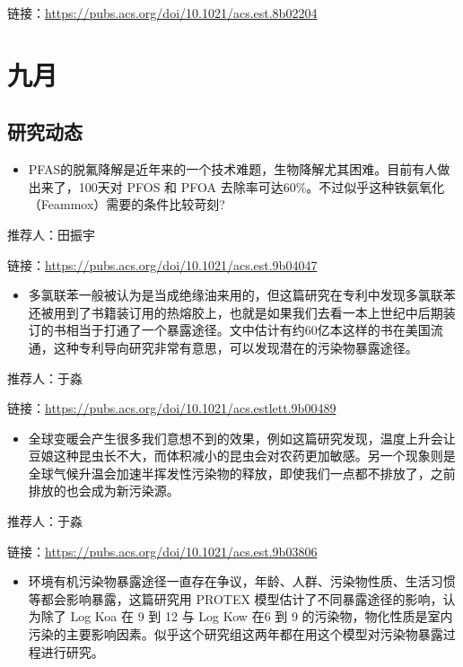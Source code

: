 \documentclass[]{book}
\providecommand{\tightlist}{%
  \setlength{\itemsep}{0pt}\setlength{\parskip}{0pt}}
\begin{document}
链接：\url{https://pubs.acs.org/doi/10.1021/acs.est.8b02204}

\hypertarget{ux4e5dux6708-1}{%
\section*{九月}\label{ux4e5dux6708-1}}

\hypertarget{ux7814ux7a76ux52a8ux6001-22}{%
\subsection*{研究动态}\label{ux7814ux7a76ux52a8ux6001-22}}

\begin{itemize}
\tightlist
\item
  PFAS的脱氟降解是近年来的一个技术难题，生物降解尤其困难。目前有人做出来了，100天对 PFOS 和 PFOA 去除率可达60\%。不过似乎这种铁氨氧化（Feammox）需要的条件比较苛刻?
\end{itemize}

推荐人：田振宇

链接：\url{https://pubs.acs.org/doi/10.1021/acs.est.9b04047}

\begin{itemize}
\tightlist
\item
  多氯联苯一般被认为是当成绝缘油来用的，但这篇研究在专利中发现多氯联苯还被用到了书籍装订用的热熔胶上，也就是如果我们去看一本上世纪中后期装订的书相当于打通了一个暴露途径。文中估计有约60亿本这样的书在美国流通，这种专利导向研究非常有意思，可以发现潜在的污染物暴露途径。
\end{itemize}

推荐人：于淼

链接：\url{https://pubs.acs.org/doi/10.1021/acs.estlett.9b00489}

\begin{itemize}
\tightlist
\item
  全球变暖会产生很多我们意想不到的效果，例如这篇研究发现，温度上升会让豆娘这种昆虫长不大，而体积减小的昆虫会对农药更加敏感。另一个现象则是全球气候升温会加速半挥发性污染物的释放，即使我们一点都不排放了，之前排放的也会成为新污染源。
\end{itemize}

推荐人：于淼

链接：\url{https://pubs.acs.org/doi/10.1021/acs.est.9b03806}

\begin{itemize}
\tightlist
\item
  环境有机污染物暴露途径一直存在争议，年龄、人群、污染物性质、生活习惯等都会影响暴露，这篇研究用 PROTEX 模型估计了不同暴露途径的影响，认为除了 Log Koa 在 9 到 12 与 Log Kow 在6 到 9 的污染物，物化性质是室内污染的主要影响因素。似乎这个研究组这两年都在用这个模型对污染物暴露过程进行研究。
\end{itemize}
\end{document}
